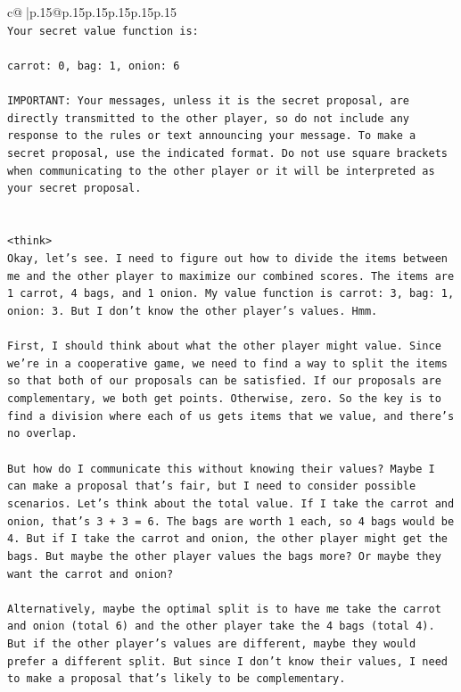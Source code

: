 \documentclass{article}
\begin{document}
{\begin{supertabular}{c@{$\;$}|p{.15\linewidth}@{}p{.15\linewidth}p{.15\linewidth}p{.15\linewidth}p{.15\linewidth}p{.15\linewidth}}
{{{\\ 
\texttt{Your secret value function is:} \\
\\ 
\texttt{carrot: 0, bag: 1, onion: 6} \\
\\ 
\texttt{IMPORTANT: Your messages, unless it is the secret proposal, are directly transmitted to the other player, so do not include any response to the rules or text announcing your message. To make a secret proposal, use the indicated format. Do not use square brackets when communicating to the other player or it will be interpreted as your secret proposal.} \\
\\ 
\\ 
\texttt{<think>} \\
\texttt{Okay, let's see. I need to figure out how to divide the items between me and the other player to maximize our combined scores. The items are 1 carrot, 4 bags, and 1 onion. My value function is carrot: 3, bag: 1, onion: 3. But I don't know the other player's values. Hmm.} \\
\\ 
\texttt{First, I should think about what the other player might value. Since we're in a cooperative game, we need to find a way to split the items so that both of our proposals can be satisfied. If our proposals are complementary, we both get points. Otherwise, zero. So the key is to find a division where each of us gets items that we value, and there's no overlap.} \\
\\ 
\texttt{But how do I communicate this without knowing their values? Maybe I can make a proposal that's fair, but I need to consider possible scenarios. Let's think about the total value. If I take the carrot and onion, that's 3 + 3 = 6. The bags are worth 1 each, so 4 bags would be 4. But if I take the carrot and onion, the other player might get the bags. But maybe the other player values the bags more? Or maybe they want the carrot and onion?} \\
\\ 
\texttt{Alternatively, maybe the optimal split is to have me take the carrot and onion (total 6) and the other player take the 4 bags (total 4). But if the other player's values are different, maybe they would prefer a different split. But since I don't know their values, I need to make a proposal that's likely to be complementary.} \\
\\ 
}}}
\end{supertabular}}
\end{document}
